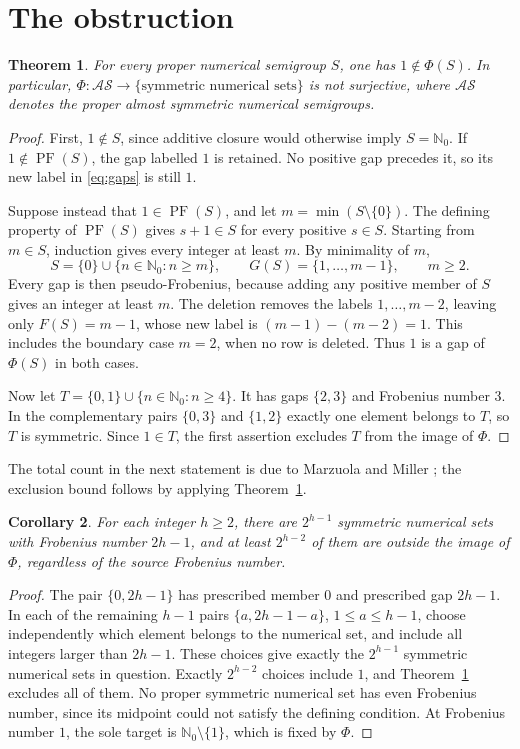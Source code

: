 \documentclass[11pt]{article}
\newtheorem{theorem}{Theorem}
\newtheorem{corollary}[theorem]{Corollary}
\newcommand{\N}{\mathbb{N}_0}
\newcommand{\PF}{\operatorname{PF}}
\newcommand{\AS}{\mathcal{AS}}
\begin{document}
\section{The obstruction}
\begin{theorem}\label{thm:one}
For every proper numerical semigroup $S$, one has $1\notin\Phi(S)$.
In particular, $\Phi:\AS\longrightarrow\{\text{symmetric numerical sets}\}$
is not surjective, where $\AS$ denotes the proper almost symmetric
numerical semigroups.
\end{theorem}
\begin{proof}
First, $1\notin S$, since additive closure would otherwise imply $S=\N$.
If $1\notin\PF(S)$, the gap labelled $1$ is retained. No positive gap precedes
it, so its new label in \eqref{eq:gaps} is still $1$.

Suppose instead that $1\in\PF(S)$, and let $m=\min(S\setminus\{0\})$.
The defining property of $\PF(S)$ gives $s+1\in S$ for every positive
$s\in S$. Starting from $m\in S$, induction gives every integer at least $m$.
By minimality of $m$,
\[
 S=\{0\}\cup\{n\in\N:n\geq m\},\qquad
 G(S)=\{1,\ldots,m-1\},\qquad m\geq2.
\]
Every gap is then pseudo-Frobenius, because adding any positive member of $S$
gives an integer at least $m$. The deletion removes the labels
$1,\ldots,m-2$, leaving only $F(S)=m-1$, whose new label is
$(m-1)-(m-2)=1$. This includes the boundary case $m=2$, when no row is deleted.
Thus $1$ is a gap of $\Phi(S)$ in both cases.

Now let $T=\{0,1\}\cup\{n\in\N:n\geq4\}$.
It has gaps $\{2,3\}$ and Frobenius number $3$. In the complementary pairs
$\{0,3\}$ and $\{1,2\}$ exactly one element belongs to $T$, so $T$ is symmetric.
Since $1\in T$, the first assertion excludes $T$ from the image of $\Phi$.
\end{proof}

The total count in the next statement is due to Marzuola and Miller
\cite[p.~12]{MM}; the exclusion bound follows by applying Theorem~\ref{thm:one}.
\begin{corollary}\label{cor:half}
For each integer $h\geq2$, there are $2^{h-1}$ symmetric numerical sets
with Frobenius number $2h-1$, and at least $2^{h-2}$ of them are outside
the image of $\Phi$, regardless of the source Frobenius number.
\end{corollary}
\begin{proof}
The pair $\{0,2h-1\}$ has prescribed member $0$ and prescribed gap $2h-1$.
In each of the remaining $h-1$ pairs $\{a,2h-1-a\}$, $1\leq a\leq h-1$,
choose independently which element belongs to the numerical set, and include
all integers larger than $2h-1$. These choices give exactly the
$2^{h-1}$ symmetric numerical sets in question.
Exactly $2^{h-2}$ choices include $1$, and Theorem~\ref{thm:one} excludes all
of them. No proper symmetric numerical set has even Frobenius number, since
its midpoint could not satisfy the defining condition. At Frobenius number
$1$, the sole target is $\N\setminus\{1\}$, which is fixed by $\Phi$.
\end{proof}
\end{document}
